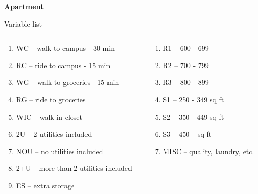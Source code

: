 \documentclass[aspectratio=1610,pdftex,dvipsnames,compress,xcolor={dvipsnames}]{beamer}
\begin{document}
\begin{frame}[plain]{}
    \centering\LARGE\textbf{Apartment}
\end{frame}


\addtocounter{framenumber}{-1}
\begin{frame}{Variable list}
    \begin{columns}[t]

        \begin{column}{0.50\textwidth}
            \begin{enumerate}[series=outerlist,topsep=0pt,itemsep=3pt,leftmargin=*,label=(\arabic*)]
                \item[]WC -- walk to campus - 30 min
                \item[]RC -- ride to campus - 15 min
                \item[]WG -- walk to groceries - 15 min
                \item[]RG -- ride to groceries
                \item[]WIC -- walk in closet
                \item[]2U -- 2 utilities included
                \item[]NOU -- no utilities included
                \item[]2+U -- more than 2 utilities included
                \item[]ES -- extra storage
            \end{enumerate}
        \end{column}

        \begin{column}{0.50\textwidth}
            \begin{enumerate}[series=outerlist,topsep=0pt,itemsep=3pt,leftmargin=*,label=(\arabic*)]
                \item[]R1 -- 600 - 699
                \item[]R2 -- 700 - 799
                \item[]R3 -- 800 - 899
                \item[]S1 -- 250 - 349 sq ft
                \item[]S2 -- 350 - 449 sq ft
                \item[]S3 -- 450+ sq ft
                \item[]MISC -- quality, laundry, etc.
            \end{enumerate}
        \end{column}

    \end{columns}
\end{frame}
\end{document}
